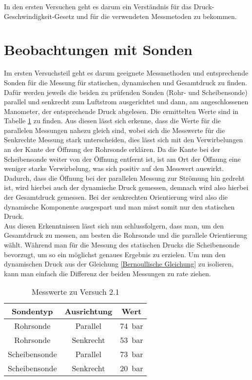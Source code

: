 In den ersten Versuchen geht es darum ein Verständnis für das Druck-Geschwindigkeit-Gesetz und für die verwendeten Messmetoden zu bekommen.

\section{Beobachtungen mit Sonden}

Im ersten Versuchsteil geht es darum geeignete Messmethoden und entsprechende Sonden für die Messung für statischen, dynamischen und Gesamtdruck zu finden. Dafür werden jeweils die beiden zu prüfenden Sonden (Rohr- und Scheibensonde) parallel und senkrecht zum Luftstrom ausgerichtet und dann, am angeschlossenen Manometer, der entsprechende Druck abgelesen. Die ermittelten Werte sind in Tabelle \ref{tab:TabelleD1} zu finden. Aus diesen lässt sich erkenne, dass die Werte für die parallelen Messungen nahezu gleich sind, wobei sich die Messwerte für die Senkrechte Messung stark unterscheiden, dies lässt sich mit den Verwirbelungen an der Kante der Öffnung der Rohrsonde erklären. Da die Kante bei der Scheibensonde weiter von der Öffnung entfernt ist, ist am Ort der Öffnung eine weniger starke Verwirbelung, was sich positiv auf den Messwert auswirkt. Dadurch, dass die Öffnung bei der parallelen Messung zur Strömung hin gedreht ist, wird hierbei auch der dynamische Druck gemessen, demnach wird also hierbei der Gesamtdruck gemessen. Bei der senkrechten Orientierung wird also die dynamische Komponente ausgespart und man misst somit nur den statischen Druck. \\
Aus diesen Erkenntnissen lässt sich nun schlussfolgern, dass man, um den Gesamtdruck zu messen, am besten die Rohrsonde und die parallele Orientierung wählt. Während man für die Messung des statischen Drucks die Scheibensonde bevorzugt, um so ein möglichst genaues Ergebnis zu erzielen. Um nun den dynamischen Druck aus der Gleichung \ref{Bernoullische Gleichung} zu isolieren, kann man einfach die Differenz der beiden Messungen zu rate ziehen.

\begin{table}[]
    \centering
    \caption{Messwerte zu Versuch 2.1}
    \begin{tabular}{c c c}
    	\hline
    	Sondentyp & Ausrichtung & Wert \\
    	\hline
    	Rohrsonde & Parallel &  \SI{74}{\bar}\\
    	Rohrsonde  & Senkrecht & \SI{53}{\bar}\\
    	Scheibensonde & Parallel & \SI{73}{\bar}\\
    	Scheibensonde & Senkrecht &  \SI{20}{\bar}\\
    	\hline
    \end{tabular}
    \label{tab:TabelleD1}
\end{table}

